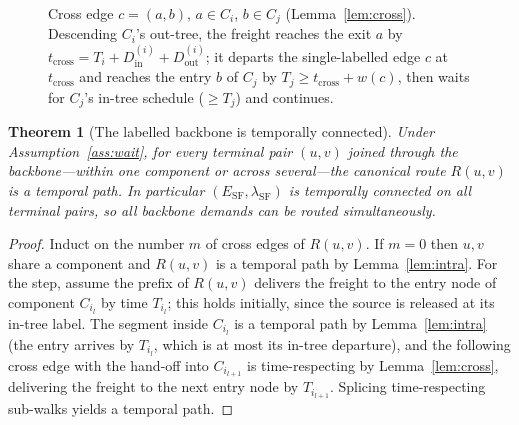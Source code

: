 \documentclass[11pt]{article}
\newtheorem{theorem}{Theorem}
\theoremstyle{definition}
\theoremstyle{remark}
\newcommand{\ESF}{E_{\mathrm{SF}}}
\newcommand{\Din}{D^{(i)}_{\mathrm{in}}}
\newcommand{\Dout}{D^{(i)}_{\mathrm{out}}}
\begin{document}
\begin{figure}[H]
\centering
{}
\caption{Cross edge $c=(a,b)$, $a\in C_i$, $b\in C_j$ (Lemma~\ref{lem:cross}). Descending $C_i$'s
out-tree, the freight reaches the exit $a$ by $t_{\mathrm{cross}}=T_i+\Din+\Dout$; it departs the
single-labelled edge $c$ at $t_{\mathrm{cross}}$ and reaches the entry $b$ of $C_j$ by
$T_j\ge t_{\mathrm{cross}}+w(c)$, then waits for $C_j$'s in-tree schedule ($\ge T_j$) and continues.}
\label{fig:cross}
\end{figure}

\begin{theorem}[The labelled backbone is temporally connected]\label{thm:temporal}
Under Assumption~\ref{ass:wait}, for every terminal pair $(u,v)$ joined through the backbone---within
one component or across several---the canonical route $R(u,v)$ is a temporal path. In particular
$(\ESF,\lambda_{\mathrm{SF}})$ is temporally connected on all terminal pairs, so all backbone demands
can be routed simultaneously.
\end{theorem}

\begin{proof}
Induct on the number $m$ of cross edges of $R(u,v)$. If $m=0$ then $u,v$ share a component and $R(u,v)$
is a temporal path by Lemma~\ref{lem:intra}. For the step, assume the prefix of $R(u,v)$ delivers the
freight to the entry node of component $C_{i_l}$ by time $T_{i_l}$; this holds initially, since the
source is released at its in-tree label. The segment inside $C_{i_l}$ is a temporal path by
Lemma~\ref{lem:intra} (the entry arrives by $T_{i_l}$, which is at most its in-tree departure), and the
following cross edge with the hand-off into $C_{i_{l+1}}$ is time-respecting by Lemma~\ref{lem:cross},
delivering the freight to the next entry node by $T_{i_{l+1}}$. Splicing time-respecting sub-walks
yields a temporal path.
\end{proof}
\end{document}
